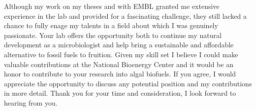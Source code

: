 \documentclass[11pt,a4paper,sans]{moderncv}
\begin{document}
\begin{spacing}{1.15}
Although my work on my theses and with EMBL granted me extensive experience in the lab and provided for a fascinating challenge, they still lacked a chance to fully enage my talents in a field about which I was genuinely passionate.
Your lab offers the opportunity both to continue my natural development as a microbiologist and help bring a sustainable and affordable alternative to fossil fuels to fruition. 
Given my skill set I believe I could make valuable contributions at the National Bioenergy Center and it would be an honor to contribute to your research into algal biofuels. 
If you agree, I would appreciate the opportunity to discuss any potential position and my contributions in more detail. 
Thank you for your time and consideration, I look forward to hearing from you.


 

\end{spacing}
\makeletterclosing
\end{document}
